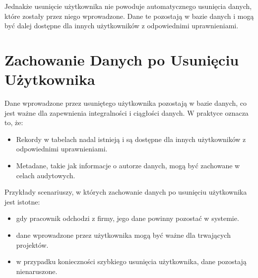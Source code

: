\documentclass[letterpaper,10pt,polish]{sphinxmanual}
\begin{document}
\begin{sphinxVerbatim}[commandchars=\\\{\}]
  
\end{sphinxVerbatim}

\sphinxAtStartPar
Jednakże usunięcie użytkownika nie powoduje automatycznego usunięcia
danych, które zostały przez niego wprowadzone. Dane te pozostają w bazie
danych i mogą być dalej dostępne dla innych użytkowników z odpowiednimi
uprawnieniami.


\section{Zachowanie Danych po Usunięciu Użytkownika}
\label{\detokenize{sprawozdanie/source/rozdzialy/rozdzial3:zachowanie-danych-po-usunieciu-uzytkownika}}
\sphinxAtStartPar
Dane wprowadzone przez usuniętego użytkownika pozostają w bazie danych,
co jest ważne dla zapewnienia integralności i ciągłości danych. W
praktyce oznacza to, że:
\begin{itemize}
\item {} 
\sphinxAtStartPar
Rekordy w tabelach nadal istnieją i są dostępne dla innych
użytkowników z odpowiednimi uprawnieniami.

\item {} 
\sphinxAtStartPar
Metadane, takie jak informacje o autorze danych, mogą być zachowane w
celach audytowych.

\end{itemize}

\sphinxAtStartPar
Przykłady scenariuszy, w których zachowanie danych po usunięciu
użytkownika jest istotne:
\begin{itemize}
\item {} 
\sphinxAtStartPar
{} \sphinxhyphen{} gdy pracownik odchodzi z firmy, jego dane
powinny pozostać w systemie.

\item {} 
\sphinxAtStartPar
{} \sphinxhyphen{} dane wprowadzone przez użytkownika mogą
być ważne dla trwających projektów.

\item {} 
\sphinxAtStartPar
{} \sphinxhyphen{} w przypadku konieczności szybkiego
usunięcia użytkownika, dane pozostają nienaruszone.

\end{itemize}
\end{document}
